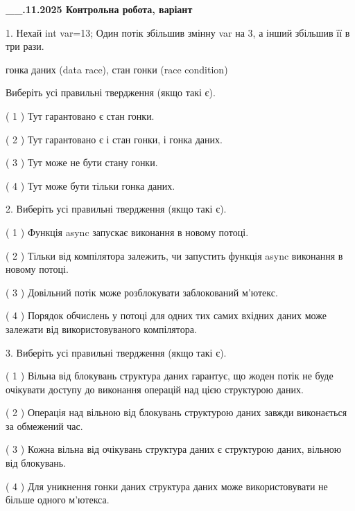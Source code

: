 \documentclass[12pt, ukrainian]{article}
\begin{document}
\newpage
\begin {large}

\textbf{\_\_.11.2025 Контрольна робота, варіант  }\par


{
1. Нехай int var=13; Один потік збільшив змінну var на 3, а інший збільшив її в три рази.

гонка даних (data race), стан гонки (race condition)

Виберіть усі правильні твердження (якщо такі є).\par
\vspace{2mm}
( 1 ) Тут гарантовано є стан гонки.%

( 2 ) Тут гарантовано є і стан гонки, і гонка даних.%

( 3 ) Тут може не бути стану гонки.%

( 4 ) Тут може бути тільки гонка даних.%


2. Виберіть усі правильні твердження (якщо такі є).\par
\vspace{2mm}

( 1 ) Функція async запускає виконання в новому потоці.%

( 2 ) Тільки від компілятора залежить, чи запустить функція async виконання в новому потоці.%

( 3 ) Довільний потік може розблокувати заблокований м’ютекс.%

( 4 ) Порядок обчислень у потоці для одних тих самих вхідних даних може залежати від використовуваного компілятора.%


3. Виберіть усі правильні твердження (якщо такі є).\par
\vspace{2mm}

( 1 ) Вільна від блокувань структура даних гарантує, що жоден потік не буде очікувати доступу до виконання операцій над цією структурою даних.%

( 2 ) Операція над вільною від блокувань структурою даних завжди виконається за обмежений час.%

( 3 ) Кожна вільна від очікувань структура даних є структурою даних, вільною від блокувань.%

( 4 ) Для уникнення гонки даних структура даних може використовувати не більше одного м’ютекса.%


}
\end{large}
\end{document}
